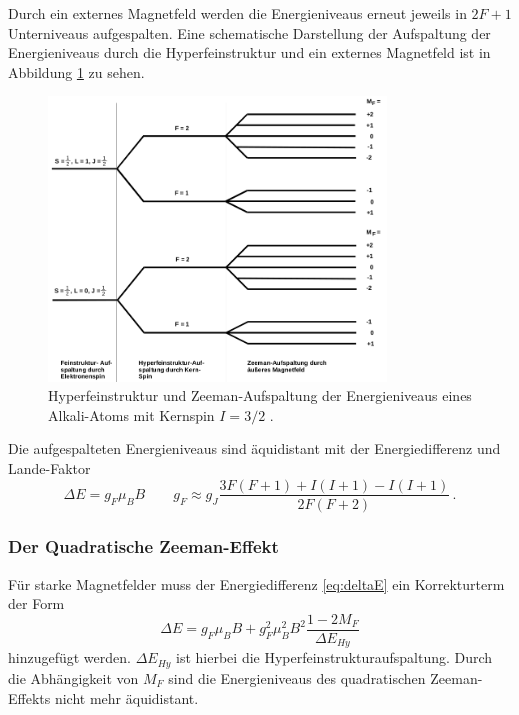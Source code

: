 Durch ein externes Magnetfeld werden die Energieniveaus erneut jeweils in $2F+1$ Unterniveaus aufgespalten.
Eine schematische Darstellung der Aufspaltung der Energieniveaus durch die Hyperfeinstruktur und ein externes Magnetfeld ist in Abbildung \ref{fig:tfig1} zu sehen.
\FloatBarrier
\begin{figure}[h]
    \centering
    \includegraphics[width=0.8\textwidth]{Hyperfeinstruktur.png}
    \caption{Hyperfeinstruktur und Zeeman-Aufspaltung der Energieniveaus eines Alkali-Atoms mit Kernspin $I=3/2$ \cite[4]{quelle01}.}
    \label{fig:tfig1}
\end{figure}
\FloatBarrier
\noindent
Die aufgespalteten Energieniveaus sind äquidistant mit der Energiedifferenz und Lande-Faktor
\begin{equation}
\label{eq:kernspin}
\Delta E = g_F \mu_B B \qquad g_F \approx g_J \frac{3 F(F+1)+I(I+1)- I(I+1)}{2F(F+2)}\, .
\end{equation}

\subsubsection*{Der Quadratische Zeeman-Effekt}
Für starke Magnetfelder muss der Energiedifferenz \eqref{eq:deltaE} ein Korrekturterm der Form
\begin{equation}
    \label{eq:zeemanman}
\Delta E = g_F \mu_B B + g_F^2 \mu_B^2 B^2 \frac{1-2M_F}{\Delta E_{Hy}}
\end{equation}
hinzugefügt werden.
$\Delta E_{Hy}$ ist hierbei die Hyperfeinstrukturaufspaltung.
Durch die Abhängigkeit von $M_F$ sind die Energieniveaus des quadratischen Zeeman-Effekts nicht mehr äquidistant.


